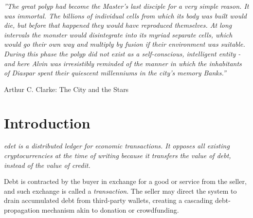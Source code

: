 \documentclass[11pt]{article}
\begin{document}
\begin{abstract}
For each attack, we provide formal bounds on extractable value or provably zero expected gain. The protocol includes a confidence-weighted local trust model, a logarithmic volume-maturation tolerance ramp, a rolling recent-failure-rate window for behavioral-switch detection, a witness-based failure contagion mechanism, and a trust banking cap to prevent accumulate-then-defect strategies. We provide formal convergence proofs, isolation theorems, and economic break-even analyses.
\end{abstract}
\pagebreak

\tableofcontents

\pagebreak

\begin{flushright}
\hfill \break
\hfill \break
\hfill \break
\hfill \break
\hfill \break
\hfill \break
\hfill \break
\hfill \break
\em ''The great polyp had become the Master's last disciple for a very simple reason. It was immortal. The billions of individual cells from which its body was built would die, but before that happened they would have reproduced themselves. At long intervals the monster would disintegrate into its myriad separate cells, which would go their own way and multiply by fusion if their environment was suitable. During this phase the polyp did not exist as a self-conscious, intelligent entity - and here Alvin was irresistibly reminded of the manner in which the inhabitants of Diaspar spent their quiescent millenniums in the city's memory Banks.''\em

Arthur C. Clarke: The City and the Stars

\end{flushright}

\pagebreak

\section{Introduction}

\em edet \em is a distributed ledger for economic transactions. It opposes all existing cryptocurrencies at the time of writing because it transfers the value of debt, instead of the value of credit.

Debt is contracted by the buyer in exchange for a good or service from the seller, and such exchange is called a \emph{transaction}. The seller may direct the system to drain accumulated debt from third-party wallets, creating a cascading debt-propagation mechanism akin to donation or crowdfunding.
\end{document}
